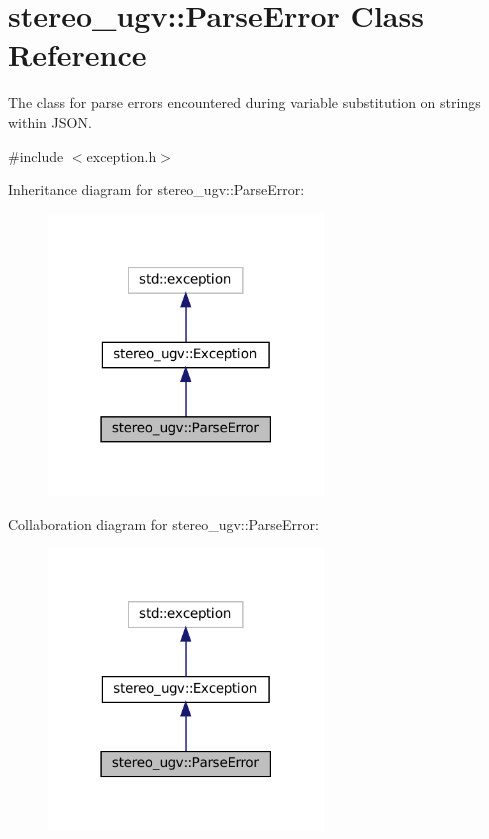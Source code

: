 \hypertarget{classstereo__ugv_1_1ParseError}{}\section{stereo\+\_\+ugv\+:\+:Parse\+Error Class Reference}
\label{classstereo__ugv_1_1ParseError}


The class for parse errors encountered during variable substitution on strings within J\+S\+ON.  




{\ttfamily \#include $<$exception.\+h$>$}



Inheritance diagram for stereo\+\_\+ugv\+:\+:Parse\+Error\+:\nopagebreak
\begin{figure}[H]
\begin{center}
\leavevmode
\includegraphics[width=207pt]{classstereo__ugv_1_1ParseError__inherit__graph}
\end{center}
\end{figure}


Collaboration diagram for stereo\+\_\+ugv\+:\+:Parse\+Error\+:\nopagebreak
\begin{figure}[H]
\begin{center}
\leavevmode
\includegraphics[width=207pt]{classstereo__ugv_1_1ParseError__coll__graph}
\end{center}
\end{figure}
